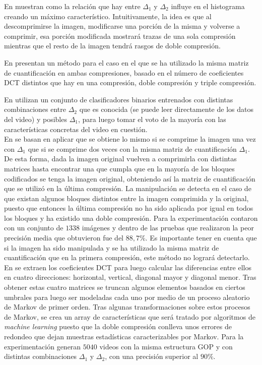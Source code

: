 En \cite{fridrich:2003} muestran como la relación que hay entre $\Delta_1$ y $\Delta_2$ influye en el histograma creando un máximo característico. Intuitivamente, la idea es que al descomprimirse la imagen, modificarse una porción de la misma y volverse a comprimir, esa porción modificada mostrará trazas de una sola compresión mientras que el resto de la imagen tendrá rasgos de doble compresión. 

En \cite{huang:2014} presentan un método para el caso en el que se ha utilizado la misma matriz de cuantificación en ambas compresiones, basado  en el número de coeficientes DCT distintos que hay en una compresión, doble compresión y triple compresión.

En \cite{wang:2013} utilizan un conjunto de clasificadores binarios entrenados con distintas combinaciones entre $\Delta_2$ que es conocida (se puede leer directamente de los datos del video) y posibles $\Delta_1$, para luego tomar el voto de la mayoría con las características concretas del video en cuestión. \\

En \cite{tariang:2017} se basan en aplicar que se obtiene lo mismo si se comprime la imagen una vez con $\Delta_1$ que si se comprime dos veces con la misma matriz de cuantificación $\Delta_1$. De esta forma, dada la imagen original vuelven a comprimirla con distintas matrices hasta encontrar una que cumpla que en la mayoría de los bloques codificados se tenga la imagen original, obteniendo así la matriz de cuantificación que se utilizó en la última compresión. La manipulación se detecta en el caso de que existan algunos bloques distintos entre la imagen comprimida y la original, puesto que entonces la última compresión no ha sido aplicada por igual en todos los bloques y ha existido una doble compresión. Para la experimentación contaron con un conjunto de $1338$ imágenes y dentro de las pruebas que realizaron la peor precisión media que obtuvieron fue del $88,7\%$. Es importante tener en cuenta que si la imagen ha sido manipulada y se ha utilizado la misma matriz de cuantificación que en la primera compresión, este método no logrará detectarlo. \\

En \cite{sun:2013} se extraen los coeficientes DCT para luego calcular las diferencias entre ellos en cuatro direcciones: horizontal, vertical, diagonal mayor y diagonal menor. Tras obtener estas cuatro matrices se truncan algunos elementos basados en ciertos umbrales para luego ser modeladas cada uno por medio de un proceso aleatorio de Markov de primer orden. Tras algunas transformaciones sobre estos procesos de Markov, se crea un array de características que será tratado por algoritmos de \textit{machine learning} puesto que la doble compresión conlleva unos errores de redondeo que dejan muestras estadísticas caracterizables por Markov. Para la experimentación generan $5040$ videos con la misma estructura GOP y con distintas combinaciones $\Delta_1$ y $\Delta_2$, con una precisión superior al $90\%$. \\

